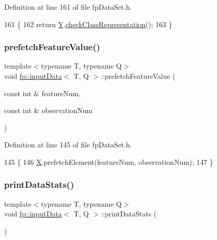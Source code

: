 Definition at line 161 of file fp\+Data\+Set.\+h.


\begin{DoxyCode}
161                             \{
162             \textcolor{keywordflow}{return} \hyperlink{classfp_1_1inputData_a2ec8c0c7b9a8e114673c703edea4283d}{Y}.\hyperlink{classfp_1_1inputYDataClassification_a3d75b2eec77611b51722018637b8c7e1}{checkClassRepresentation}();
163         \}
\end{DoxyCode}
\mbox{\label{classfp_1_1inputData_a348baff7c24d263bb24185dbaa19d455}} 
\subsubsection{\texorpdfstring{prefetch\+Feature\+Value()}{prefetchFeatureValue()}}
{\footnotesize\ttfamily template$<$typename T, typename Q$>$ \\
void \hyperlink{classfp_1_1inputData}{fp\+::input\+Data}$<$ T, Q $>$\+::prefetch\+Feature\+Value (\begin{DoxyParamCaption}\item[{const int \&}]{feature\+Num,  }\item[{const int \&}]{observation\+Num }\end{DoxyParamCaption})\hspace{0.3cm}{\ttfamily [inline]}}



Definition at line 145 of file fp\+Data\+Set.\+h.


\begin{DoxyCode}
145                                                                                           \{
146             \hyperlink{classfp_1_1inputData_ad19581a60d2af60ebd3c8be5ac5ad95e}{X}.prefetchElement(featureNum, observationNum);
147         \}
\end{DoxyCode}
\mbox{\label{classfp_1_1inputData_a1311eef0523910e3b69ad828b55bf19b}} 
\subsubsection{\texorpdfstring{print\+Data\+Stats()}{printDataStats()}}
{\footnotesize\ttfamily template$<$typename T, typename Q$>$ \\
void \hyperlink{classfp_1_1inputData}{fp\+::input\+Data}$<$ T, Q $>$\+::print\+Data\+Stats (\begin{DoxyParamCaption}{ }\end{DoxyParamCaption})\hspace{0.3cm}{\ttfamily [inline]}}



